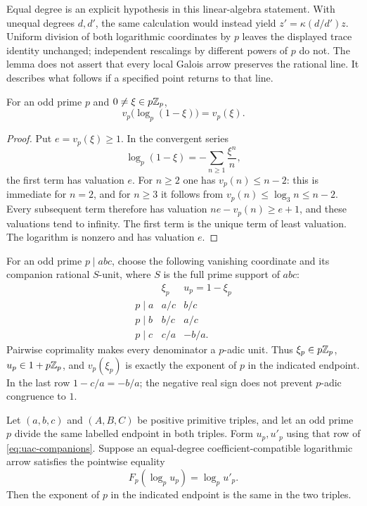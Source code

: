 Equal degree is an explicit hypothesis in this linear-algebra statement.
With unequal degrees $d,d'$, the same calculation would instead yield
$z'=\kappa(d/d')z$. Uniform division of both logarithmic coordinates
by $p$ leaves the displayed trace identity unchanged; independent
rescalings by different powers of $p$ do not. The lemma does not assert
that every local Galois arrow preserves the rational line. It describes
what follows if a specified point returns to that line.

\begin{lemma}
\label{lem:uac-log-depth}
For an odd prime $p$ and $0\ne\xi\in p\mathbb Z_p$,
\begin{equation}\label{eq:uac-log-depth}
                  v_p\bigl(\log_p(1-\xi)\bigr)=v_p(\xi).
\end{equation}
\end{lemma}

\begin{proof}
Put $e=v_p(\xi)\ge1$. In the convergent series
\[
                    \log_p(1-\xi)=-\sum_{n\ge1}\frac{\xi^n}{n},
\]
the first term has valuation $e$. For $n\ge2$ one has
$v_p(n)\le n-2$: this is immediate for $n=2$, and for $n\ge3$
it follows from $v_p(n)\le\log_3 n\le n-2$.
Every subsequent term therefore has valuation
$ne-v_p(n)\ge e+1$, and these valuations tend to infinity.
The first term is the unique term of least valuation. The logarithm
is nonzero and has valuation $e$.
\end{proof}

For an odd prime $p\mid abc$, choose the following vanishing coordinate
and its companion rational $S$-unit, where $S$ is the full prime support
of $abc$:
\begin{equation}\label{eq:uac-companions}
\begin{array}{c|cc}
 &\xi_p&u_p=1-\xi_p\\ \hline
 p\mid a&a/c&b/c\\
 p\mid b&b/c&a/c\\
 p\mid c&c/a&-b/a .
\end{array}
\end{equation}
Pairwise coprimality makes every denominator a $p$-adic unit. Thus
$\xi_p\in p\mathbb Z_p$, $u_p\in1+p\mathbb Z_p$, and $v_p(\xi_p)$ is exactly
the exponent of $p$ in the indicated endpoint. In the last row
$1-c/a=-b/a$; the negative real sign does not prevent
$p$-adic congruence to $1$.

\begin{proposition}
\label{prop:uac-endpoint-depth}
Let $(a,b,c)$ and $(A,B,C)$ be positive primitive triples, and let
an odd prime $p$ divide the same labelled endpoint in both triples.
Form $u_p,u'_p$ using that row of \eqref{eq:uac-companions}.
Suppose an equal-degree coefficient-compatible logarithmic arrow
satisfies the pointwise equality
\begin{equation}\label{eq:uac-point-match}
                         F_p(\log_p u_p)=\log_p u'_p .
\end{equation}
Then the exponent of $p$ in the indicated endpoint is the same in
the two triples.
\end{proposition}

